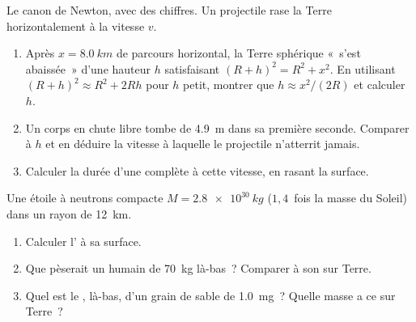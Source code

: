 \begin{exercise}[$\star\star\star$]\label{exo:g10:universal-gravitation:13}
Le canon de Newton, avec des chiffres. Un projectile rase la Terre
horizontalement à la vitesse $v$.
\begin{enumerate}
  \item Après $x = \qty{8.0}{km}$ de parcours horizontal, la Terre
        sphérique «~s'est abaissée~» d'une hauteur $h$ satisfaisant
        $(R + h)^2 = R^2 + x^2$. En utilisant
        $(R + h)^2 \approx R^2 + 2Rh$ pour $h$ petit, montrer que
        $h \approx x^2 / (2R)$ et calculer $h$.
  \item Un corps en chute libre tombe de \qty{4.9}{m} dans sa première
        seconde. Comparer à $h$ et en déduire la vitesse à laquelle le
        projectile n'atterrit jamais.
  \item Calculer la durée d'une  complète à cette
        vitesse, en rasant la surface.
\end{enumerate}
\end{exercise}

\begin{exercise}[$\star\star\star$]\label{exo:g10:universal-gravitation:14}
Une étoile à neutrons compacte $M = \qty{2.8e30}{kg}$ ($1{,}4$~fois la
masse du Soleil) dans un rayon de \qty{12}{km}.
\begin{enumerate}
  \item Calculer l' à sa
        surface.
  \item Que pèserait un humain de \qty{70}{kg} là-bas~? Comparer à son
         sur Terre.
  \item Quel est le , là-bas, d'un grain de sable de
        \qty{1.0}{mg}~? Quelle masse a ce  sur Terre~?
\end{enumerate}
\end{exercise}

